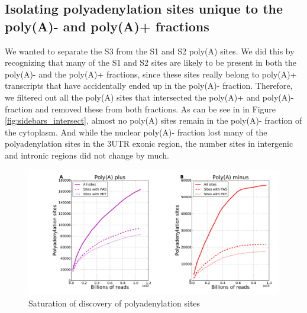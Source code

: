 \subsection{Isolating polyadenylation sites unique to the poly(A)- and poly(A)+
fractions}
We wanted to separate the S3 from the S1 and S2 poly(A) sites. We did this by
recognizing that many of the S1 and S2 sites are likely to be present in both
the poly(A)- and the poly(A)+ fractions, since these sites really belong to
poly(A)+ transcripts that have accidentally ended up in the poly(A)- fraction.
Therefore, we filtered out all the poly(A) sites that intersected the poly(A)+
and poly(A)- fraction and removed these from both fractions. As can be see in
in Figure \ref{fig:sidebars_intersect}, almost no poly(A) sites remain in the
poly(A)- fraction of the cytoplasm. And while the nuclear poly(A)- fraction
lost many of the polyadenylation sites in the 3UTR exonic region, the number
sites in intergenic and intronic regions did not change by much.

\begin{figure}[htb]
	\begin{center}
		\includegraphics[scale=0.3]{figures/polyadenylation/Saturation_plot_2+.pdf}
	\end{center}
	\caption{Saturation of discovery of polyadenylation sites}
	\label{fig:saturation}
\end{figure}

